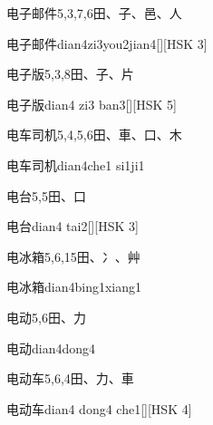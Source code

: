 \begin{entry}{电子邮件}{5,3,7,6}{⽥、⼦、⾢、⼈}
  \begin{phonetics}{电子邮件}{dian4zi3you2jian4}[][HSK 3]
  \end{phonetics}
\end{entry}

\begin{entry}{电子版}{5,3,8}{⽥、⼦、⽚}
  \begin{phonetics}{电子版}{dian4 zi3 ban3}[][HSK 5]
  \end{phonetics}
\end{entry}

\begin{entry}{电车司机}{5,4,5,6}{⽥、⾞、⼝、⽊}
  \begin{phonetics}{电车司机}{dian4che1 si1ji1}
  \end{phonetics}
\end{entry}

\begin{entry}{电台}{5,5}{⽥、⼝}
  \begin{phonetics}{电台}{dian4 tai2}[][HSK 3]
  \end{phonetics}
\end{entry}

\begin{entry}{电冰箱}{5,6,15}{⽥、⼎、⾋}
  \begin{phonetics}{电冰箱}{dian4bing1xiang1}
  \end{phonetics}
\end{entry}

\begin{entry}{电动}{5,6}{⽥、⼒}
  \begin{phonetics}{电动}{dian4dong4}
  \end{phonetics}
\end{entry}

\begin{entry}{电动车}{5,6,4}{⽥、⼒、⾞}
  \begin{phonetics}{电动车}{dian4 dong4 che1}[][HSK 4]
  \end{phonetics}
\end{entry}

